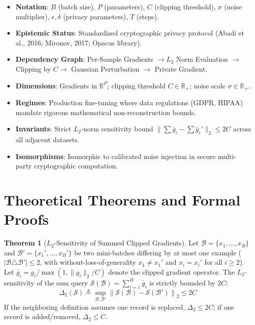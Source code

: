 \documentclass[11pt,a4paper]{article}
\theoremstyle{definition}
\newtheorem{theorem}{\textbf{Theorem}}[section]
\begin{document}
\begin{itemize}
    \item \textbf{Notation}: $B$ (batch size), $P$ (parameters), $C$ (clipping threshold), $\sigma$ (noise multiplier), $\epsilon, \delta$ (privacy parameters), $T$ (steps).
    \item \textbf{Epistemic Status}: Standardized cryptographic privacy protocol (Abadi et al., 2016; Mironov, 2017; Opacus library).
    \item \textbf{Dependency Graph}: Per-Sample Gradients $\to L_2$ Norm Evaluation $\to$ Clipping by $C \to$ Gaussian Perturbation $\to$ Private Gradient.
    \item \textbf{Dimensions}: Gradients in $\mathbb{R}^P$; clipping threshold $C \in \mathbb{R}_+$; noise scale $\sigma \in \mathbb{R}_+$.
    \item \textbf{Regimes}: Production fine-tuning where data regulations (GDPR, HIPAA) mandate rigorous mathematical non-reconstruction bounds.
    \item \textbf{Invariants}: Strict $L_2$-norm sensitivity bound $\|\sum \bar{g}_i - \sum \bar{g}_i'\|_2 \le 2C$ across all adjacent datasets.
    \item \textbf{Isomorphisms}: Isomorphic to calibrated noise injection in secure multi-party cryptographic computation.
\end{itemize}

\section{Theoretical Theorems and Formal Proofs}

\begin{theorem}[$L_2$-Sensitivity of Summed Clipped Gradients]
Let $\mathcal{B} = \{x_1, \dots, x_B\}$ and $\mathcal{B}' = \{x_1', \dots, x_B'\}$ be two mini-batches differing by at most one example ($|\mathcal{B} \triangle \mathcal{B}'| \le 2$, with without-loss-of-generality $x_1 \neq x_1'$ and $x_i = x_i'$ for all $i \ge 2$). Let $\bar{g}_i = g_i / \max(1, \|g_i\|_2 / C)$ denote the clipped gradient operator. The $L_2$-sensitivity of the sum query $\mathcal{S}(\mathcal{B}) = \sum_{i=1}^B \bar{g}_i$ is strictly bounded by $2C$:
{\boldmath
\begin{equation}
\Delta_2(\mathcal{S}) \triangleq \sup_{\mathcal{B}, \mathcal{B}'} \left\| \mathcal{S}(\mathcal{B}) - \mathcal{S}(\mathcal{B}') \right\|_2 \le 2C
\end{equation}
}
If the neighboring definition assumes one record is replaced, $\Delta_2 \le 2C$; if one record is added/removed, $\Delta_2 \le C$.
\end{theorem}
\end{document}
